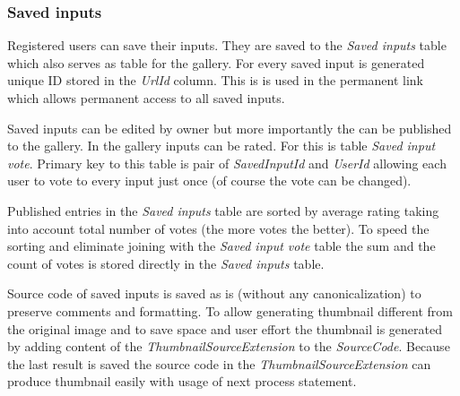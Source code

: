 \subsubsection{Saved inputs}

Registered users can save their inputs.
They are saved to the \emph{Saved inputs} table which also serves as table for the gallery.
For every saved input is generated unique ID stored in the \emph{UrlId} column.
This is is used in the permanent link which allows permanent access to all saved inputs.

Saved inputs can be edited by owner but more importantly the can be published to the gallery.
In the gallery inputs can be rated.
For this is table \emph{Saved input vote}.
Primary key to this table is pair of \emph{SavedInputId} and \emph{UserId} allowing each user to vote to every input just once (of course the vote can be changed).

Published entries in the \emph{Saved inputs} table are sorted by average rating taking into account total number of votes (the more votes the better).
To speed the sorting and eliminate joining with the \emph{Saved input vote} table the sum and the count of votes is stored directly in the \emph{Saved inputs} table.

Source code of saved inputs is saved as is (without any canonicalization) to preserve comments and formatting.
To allow generating thumbnail different from the original image and to save space and user effort the thumbnail is generated by adding content of the \emph{ThumbnailSourceExtension} to the \emph{SourceCode}.
Because the last result is saved the source code in the \emph{ThumbnailSourceExtension} can produce thumbnail easily with usage of next process statement.





































